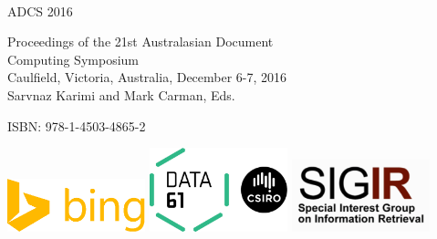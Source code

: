 \documentclass[a4paper]{article}
\begin{document}
\
\vspace{1in}





\begin{center}
{\Huge ADCS 2016}
\end{center}

\vspace{1in}

{

\huge
    {
\noindent
Proceedings of the 21st Australasian Document\\[0.2em] Computing Symposium\\[0.5em]
Caulfield, Victoria, Australia, December 6-7, 2016\\[5em]
Sarvnaz Karimi and Mark Carman, Eds.
}
}

\begin{center}
{\huge

ISBN: 978-1-4503-4865-2}
\end{center}


%


\vfill

\centerline{
\includegraphics[width=0.3\textwidth]{bing-logo}
\hfill
\includegraphics[width=0.3\textwidth]{csiro-logo}
\hfill
\includegraphics[width=0.3\textwidth]{sigir-logo.png}
}
\end{document}
